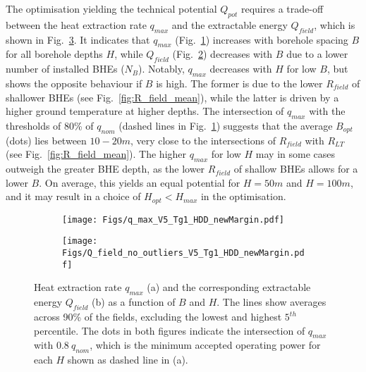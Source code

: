 The optimisation yielding the technical potential $Q_{pot}$ requires a trade-off between the heat extraction rate $q_{max}$ and the extractable energy $Q_{field}$, which is shown in Fig.~\ref{fig:optimisation}.
%
It indicates that $q_{max}$ (Fig.~\ref{fig:q_max}) increases with borehole spacing $B$ for all borehole depths $H$, while $Q_{field}$ (Fig.~\ref{fig:Q_field}) decreases with $B$ due to a lower number of installed BHEs ($N_B$).
Notably, $q_{max}$ decreases with $H$ for low $B$, but shows the opposite behaviour if $B$ is high.
The former is due to the lower $R_{field}$ of shallower BHEs (see Fig.~\ref{fig:R_field_mean}), while the latter is driven by a higher ground temperature at higher depths. 
%
The intersection of $q_{max}$ with the thresholds of 80\% of $q_{nom}$ (dashed lines in Fig.~\ref{fig:q_max}) suggests that the average $B_{opt}$ (dots) lies between $10-20m$, very close to the intersections of $R_{field}$ with $R_{LT}$ (see Fig.~\ref{fig:R_field_mean}). 
The higher $q_{max}$ for low $H$ may in some cases outweigh the greater BHE depth, as the lower $R_{field}$ of shallow BHEs allows for a lower $B$. 
On average, this yields an equal potential for $H = 50m$ and $H = 100m$, and it may result in a choice of $H_{opt} < H_{max}$ in the optimisation.


\begin{figure}[ht!]
\centering
\begin{subfigure}{.49\textwidth}
  \centering
  \texttt{[image: Figs/q\_max\_V5\_Tg1\_HDD\_newMargin.pdf]} 
  \subcaption{}
  \label{fig:q_max}
\end{subfigure}
\begin{subfigure}{.49\textwidth}
  \centering
  \texttt{[image: Figs/Q\_field\_no\_outliers\_V5\_Tg1\_HDD\_newMargin.pdf]} 
  \subcaption{}
  \label{fig:Q_field}
\end{subfigure}

\caption{Heat extraction rate $q_{max}$ (a) and  the corresponding extractable energy $Q_{field}$ (b) as a function of $B$ and $H$. 
The lines show averages across 90\% of the fields, excluding the lowest and highest $5^{th}$ percentile.
The dots in both figures indicate the intersection of $q_{max}$ with $0.8 \ q_{nom}$, which is the minimum accepted operating power for each $H$ shown as dashed line in (a).}
\label{fig:optimisation}
\end{figure}

